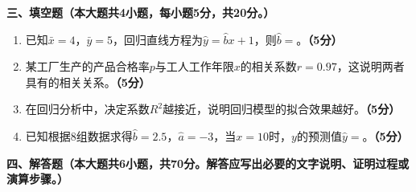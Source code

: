 \documentclass[12pt, a4paper]{ctexart}
\newcommand{\score}[1]{\hfill\textbf{（#1分）}}
\begin{document}
\vspace{0.5cm}

\noindent\textbf{三、填空题（本大题共4小题，每小题5分，共20分。）}

\vspace{0.3cm}

\begin{enumerate}[label=\textbf{\arabic*.}, leftmargin=2em, resume]

\item 已知$\bar{x} = 4$，$\bar{y} = 5$，回归直线方程为$\hat{y} = \hat{b}x + 1$，则$\hat{b} = $\hspace{3cm}。\score{5}

\item 某工厂生产的产品合格率$p$与工人工作年限$x$的相关系数$r = 0.97$，这说明两者具有\hspace{2cm}的\hspace{2cm}相关关系。\score{5}

\item 在回归分析中，决定系数$R^2$越接近\hspace{1cm}，说明回归模型的拟合效果越好。\score{5}

\item 已知根据8组数据求得$\hat{b} = 2.5$，$\hat{a} = -3$，当$x = 10$时，$y$的预测值$\hat{y} = $\hspace{3cm}。\score{5}

\end{enumerate}

\newpage

\noindent\textbf{四、解答题（本大题共6小题，共70分。解答应写出必要的文字说明、证明过程或演算步骤。）}

\vspace{0.3cm}
\end{document}
